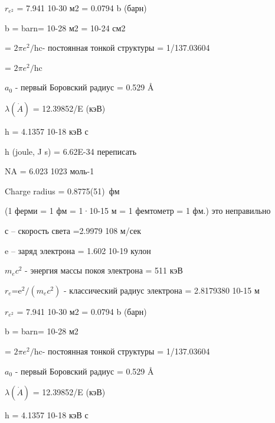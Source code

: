 \documentclass[a4paper,14pt, openany, twoside, draft]{extbook} %
\begin{document}
 $r_{e^2}$ = 7.941 10-30 м2  = 0.0794 b (барн)

b = barn= 10-28 м2 = 10-24 см2

 =  $2\pi e^2/{\text{hc}}$- постоянная тонкой структуры = 1/137.03604

 =  $2\pi e^2/{\text{hc}}$

 $a_0$ - первый Боровский радиус = 0.529 Å

$\lambda(\dot{A})$ = 12.39852/E (кэВ)

h = 4.1357 10-18 кэВ с

h (joule, J s) = 6.62E-34 переписать

NA = 6.023 1023 моль-1


Charge radius = 0.8775(51)~фм

(1 ферми = 1 фм = 1·10-15 м = 1 фемтометр = 1 фм.)  это неправильно

с – скорость света =2.9979 108 м/сек

e – заряд электрона = 1.602 10-19 кулон

 $m_ec^2$ - энергия массы покоя электрона = 511 кэВ

 $r_e{\text{=e}}^2/(m_ec^2)$ - классический радиус электрона = 2.8179380 10-15 м

 $r_{e^2}$ = 7.941 10-30 м2  = 0.0794 b (барн)

b = barn= 10-28 м2

 =  $2\pi e^2/{\text{hc}}$- постоянная тонкой структуры = 1/137.03604

 $a_0$ - первый Боровский радиус = 0.529 Å

$\lambda(\dot A)$ = 12.39852/E (кэВ)

h = 4.1357 10-18 кэВ с
\end{document}

